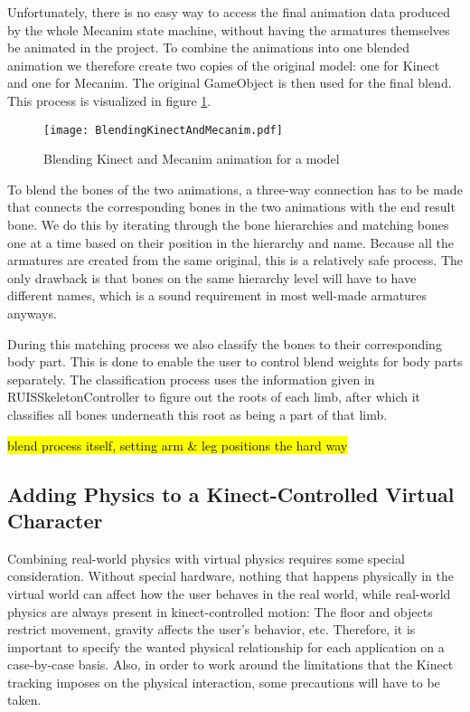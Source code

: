 \documentclass[12pt,a4paper,oneside,pdftex]{report}
\begin{document}
Unfortunately, there is no easy way to access the final animation data produced by the whole Mecanim state machine, without having the armatures themselves be animated in the project. To combine the animations into one blended animation we therefore create two copies of the original model: one for Kinect and one for Mecanim. The original GameObject is then used for the final blend. This process is visualized in figure \ref{fig:blendingkinectandmecanim}.

\begin{figure}[h]
\centering
\texttt{[image: BlendingKinectAndMecanim.pdf]}
\caption{Blending Kinect and Mecanim animation for a model}
\label{fig:blendingkinectandmecanim}
\end{figure}

To blend the bones of the two animations, a three-way connection has to be made that connects the corresponding bones in the two animations with the end result bone. We do this by iterating through the bone hierarchies and matching bones one at a time based on their position in the hierarchy and name. Because all the armatures are created from the same original, this is a relatively safe process. The only drawback is that bones on the same hierarchy level will have to have different names, which is a sound requirement in most well-made armatures anyways. 

During this matching process we also classify the bones to their corresponding body part. This is done to enable the user to control blend weights for body parts separately. The classification process uses the information given in RUISSkeletonController to figure out the roots of each limb, after which it classifies all bones underneath this root as being a part of that limb. 

\hl{blend process itself, setting arm & leg positions the hard way}

\subsection{Adding Physics to a Kinect-Controlled Virtual Character}
\label{subsection:skeletontracking:physics}

Combining real-world physics with virtual physics requires some special consideration. Without special hardware, nothing that happens physically in the virtual world can affect how the user behaves in the real world, while real-world physics are always present in kinect-controlled motion: The floor and objects restrict movement, gravity affects the user's behavior, etc. Therefore, it is important to specify the wanted physical relationship for each application on a case-by-case basis. Also, in order to work around the limitations that the Kinect tracking imposes on the physical interaction, some precautions will have to be taken.
\end{document}
